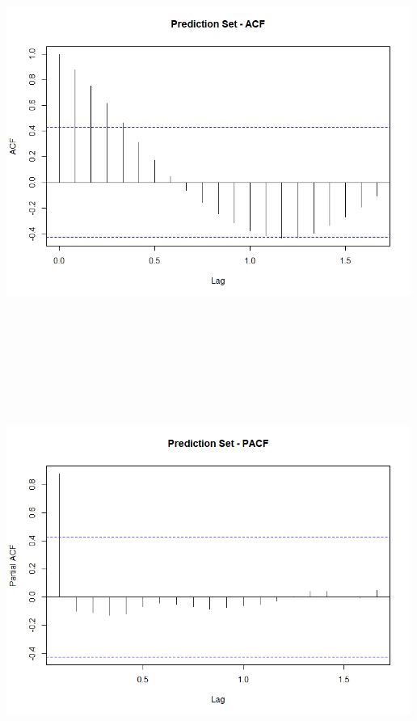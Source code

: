 \documentclass[
]{article}
\begin{document}
\includegraphics[width=5.20833in,height=5.20833in]{03_visuals/pred_acf.png}

\includegraphics[width=5.20833in,height=5.20833in]{03_visuals/pred_pacf.png}
\end{document}
